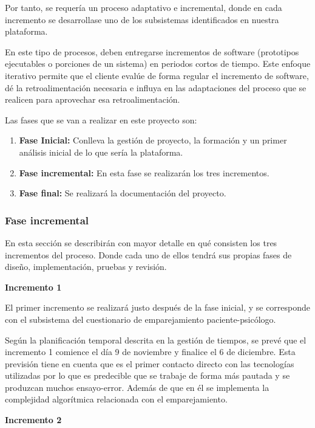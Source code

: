 Por tanto, se requería un proceso adaptativo e incremental, donde en cada incremento se desarrollase uno de los subsistemas identificados en nuestra plataforma.


En este tipo de procesos, deben entregarse incrementos de software (prototipos ejecutables o porciones de un sistema) en periodos cortos de tiempo. Este enfoque iterativo permite que el cliente evalúe de forma regular el incremento de software, dé la retroalimentación necesaria e influya en las adaptaciones del proceso que se realicen para aprovechar esa retroalimentación.


Las fases que se van a realizar en este proyecto son:
\begin{enumerate}
\item \textbf{Fase Inicial:} Conlleva la gestión de proyecto, la formación y un primer análisis inicial de lo que sería la plataforma.
\item \textbf{Fase incremental:} En esta fase se realizarán los tres incrementos.
\item \textbf{Fase final:} Se realizará la documentación del proyecto.
\end{enumerate}

\subsubsection{Fase incremental}
En esta sección se describirán con mayor detalle en qué consisten los tres incrementos del proceso. Donde cada uno de ellos tendrá sus propias fases de diseño, implementación, pruebas y revisión. \newline

\textbf{Incremento 1}\newline


El primer incremento se realizará justo después de la fase inicial, y se corresponde con el subsistema del cuestionario de emparejamiento paciente-psicólogo.


Según la planificación temporal descrita en la gestión de tiempos, se prevé que el incremento 1 comience el día 9 de noviembre y finalice el 6 de diciembre. Esta previsión tiene en cuenta que es el primer contacto directo con las tecnologías utilizadas por lo que es predecible que se trabaje de forma más pautada y se produzcan muchos ensayo-error. Además de que en él se implementa la complejidad algorítmica relacionada con el emparejamiento.\newline


\textbf{Incremento 2}\newline


